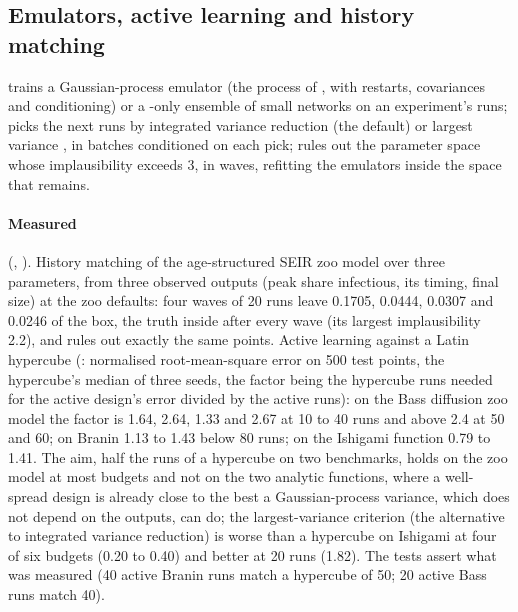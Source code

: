 \subsection{Emulators, active learning and history matching}
\label{app:emulate}

 trains a Gaussian-process emulator (the process of
, with restarts, covariances and conditioning) or a -only
ensemble of small networks on an experiment's runs;  picks the next runs
by integrated variance reduction (the default) or largest variance \citep{mackay1992information},
in batches conditioned on each pick;  \citep{vernon2010galaxy,
andrianakis2015bayesian} rules out the parameter space whose implausibility exceeds 3, in
waves, refitting the emulators inside the space that remains.

\paragraph{Measured} (, ). History matching of the
age-structured SEIR zoo model over three parameters, from three observed outputs (peak share
infectious, its timing, final size) at the zoo defaults: four waves of 20 runs leave 0.1705,
0.0444, 0.0307 and 0.0246 of the box, the truth inside after every wave (its largest
implausibility 2.2), and  rules out exactly the same points.
Active learning against a Latin hypercube (:
normalised root-mean-square error on 500 test points, the hypercube's median of three seeds,
the factor being the hypercube runs needed for the active design's error divided by the
active runs): on the Bass diffusion zoo model the factor is 1.64, 2.64, 1.33 and 2.67 at 10
to 40 runs and above 2.4 at 50 and 60; on Branin \citep{dixon1978towards} 1.13 to 1.43 below
80 runs; on the Ishigami function 0.79 to 1.41. The aim, half the runs of a
hypercube on two benchmarks, holds on the zoo model at most budgets and not on the two
analytic functions, where a well-spread design is already close to the best a
Gaussian-process variance, which does not depend on the outputs, can do; the largest-variance
criterion (the alternative to integrated variance reduction) is worse than a hypercube on
Ishigami at four of six budgets (0.20 to 0.40) and better at 20 runs (1.82). The tests assert what was
measured (40 active Branin runs match a hypercube of 50; 20 active Bass runs match 40).

